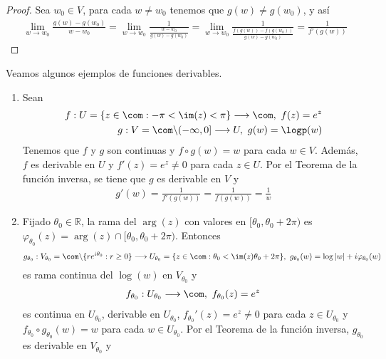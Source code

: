 \begin{proof}
Sea $w_0 \in V$, para cada $w \not = w_0$ tenemos que $g(w) \not = g(w_0)$, y así
\begin{align*}
    \lim_{w \to w_0}{\frac{g(w) - g(w_0)}{w - w_0}} = \lim_{w \to w_0}{\frac{1}{\frac{w - w_0}{g(w) - g(w_0)}}} = \lim_{w \to w_0}{\frac{1}{\frac{f(g(w)) - f(g(w_0))}{g(w) - g(w_0)}}} = \frac{1}{f'(g(w))}
\end{align*}
\end{proof}

\begin{ejemplo}
Veamos algunos ejemplos de funciones derivables.
\begin{enumerate}
    \item Sean 
    \begin{align*}
        f : U = \{ z \in \com : -\pi < \im(z) < \pi\} \longrightarrow \com, \ f(z) = e^z \\
        g : V = \com \backslash (-\infty,0] \longrightarrow U, \ g(w) = \logp(w)
    \end{align*}
    Tenemos que $f$ y $g$ son continuas y $f \circ g (w) = w$ para cada $w \in V$. Además, $f$ es derivable en $U$ y $f'(z) = e^z \not = 0$ para cada $z \in U$. Por el Teorema de la función inversa, se tiene que $g$ es derivable en $V$ y 
    \begin{align*}
        g'(w) = \frac{1}{f'(g(w))} = \frac{1}{f(g(w))} = \frac{1}{w}
    \end{align*}
    \item Fijado $\theta_0 \in \mathbb{R}$, la rama del $\arg(z)$ con valores en $[\theta_0,\theta_0 +2\pi)$ es $\varphi_{\theta_0}(z) = \arg(z) \cap [\theta_0,\theta_0 +2\pi)$. Entonces
    \begin{align*}
        g_{\theta_0} : V_{\theta_0} = \com \backslash \{ re^{i\theta_0} : r \ge 0 \} \longrightarrow U_{\theta_0} = \{ z \in \com : \theta_0 < \im(z) \theta_0 + 2\pi \}, \ g_{\theta_0}(w) = \log|w| + i\varphi_{\theta_0}(w)
    \end{align*}
    es rama continua del $\log(w)$ en $V_{\theta_0}$ y
    \begin{align*}
        f_{\theta_0} : U_{\theta_0} \longrightarrow \com, \ f_{\theta_0}(z) = e^z
    \end{align*}
    es continua en $U_{\theta_0}$, derivable en $U_{\theta_0}$, $f_{\theta_0}'(z) = e^z \not = 0$ para cada $z \in U_{\theta_0}$ y $f_{\theta_0} \circ g_{\theta_0}(w) = w$ para cada $w \in U_{\theta_0}$. Por el Teorema de la función inversa, $g_{\theta_0}$ es derivable en $V_{\theta_0}$ y

\end{enumerate}
\end{ejemplo}
